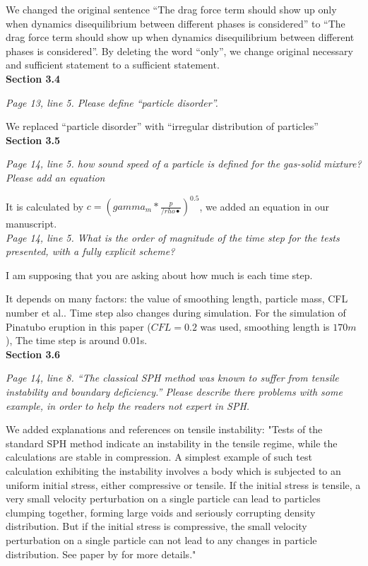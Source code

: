 \documentclass[10pt,a4paper]{article}
\begin{document}
We changed the original sentence “The drag force term should show up only when dynamics disequilibrium between different phases is considered” to “The drag force term should show up when dynamics disequilibrium between different phases is considered”. By deleting the word “only”, we change original necessary and sufficient statement to a sufficient statement. \\[6pt]

\textbf{Section 3.4}

\textit{Page 13, line 5. Please define “particle disorder”.}

We replaced “particle disorder” with “irregular distribution of particles” \\[6pt]

\textbf{Section 3.5}

\textit{Page 14, line 5. how sound speed of a particle is defined for the gas-solid mixture? Please add an equation}

It is calculated by $c=(gamma_m* \frac{p}{/rho•} )^0.5$, we added an equation in our manuscript.  \\[3pt]

\textit{Page 14, line 5. What is the order of magnitude of the time step for the tests presented, with a fully explicit scheme?}

I am supposing that you are asking about how much is each time step.

It depends on many factors: the value of smoothing length, particle mass, CFL number et al.. Time step also changes during simulation. For the simulation of Pinatubo eruption in this paper ($CFL=0.2$ was used, smoothing length is $170m$),  The time step is around 0.01s. \\[6pt]

\textbf{Section 3.6}

\textit{Page 14, line 8. “The classical SPH method was known to suffer from tensile instability and boundary deficiency.” Please describe there problems with some example, in order
to help the readers not expert in SPH.}

We added explanations and references on tensile instability: "Tests of the standard SPH method indicate an instability in the tensile regime, while the calculations are stable in compression.  A simplest example of such test calculation exhibiting the instability involves a body which is subjected to an uniform initial stress, either compressive or tensile. If the initial stress is tensile, a very small velocity perturbation on a single particle can lead to particles clumping together, forming large voids and seriously corrupting density distribution. But if the initial stress is compressive, the small velocity perturbation on a single particle can not lead to any changes in particle distribution. See paper by \citet{swegle1995smoothed} for more details." \\[3pt] 
\end{document}
